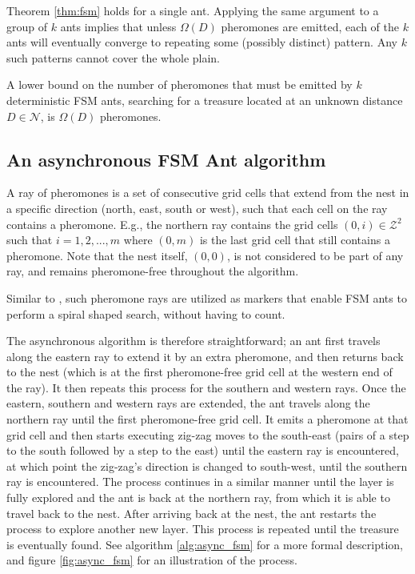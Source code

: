 \begin{observation}
Theorem \ref{thm:fsm} holds for a single ant. Applying the same argument to a group of $k$
ants implies that unless $\Omega(D)$ pheromones are emitted, each of the $k$ ants will
eventually converge to repeating some (possibly distinct) pattern. 
Any $k$ such patterns cannot cover the whole plain.
\end{observation}

\begin{corollary}
A lower bound on the number of pheromones that must be emitted by $k$ deterministic
FSM ants, searching for a treasure located at an unknown distance $D \in \mathcal{N}$, 
is $\Omega(D)$ pheromones.
\end{corollary}

\subsection{An asynchronous FSM Ant algorithm}

\begin{definition}[Ray]
A ray of pheromones is a set of consecutive grid cells that extend from the nest in a specific
direction (north, east, south or west), such that each cell on the ray contains a pheromone. 
E.g., the northern ray contains the grid cells $(0, i) \in \mathcal{Z}^2$ such that
$i = 1, 2, ..., m$ where $(0, m)$ is the last grid cell that still contains a pheromone.
Note that the nest itself, $(0,0)$, is not considered to be part of any ray, and remains 
pheromone-free throughout the algorithm.

Similar to \cite{Emek2013FSM}, such pheromone rays are utilized as markers that enable FSM ants to perform a spiral
 shaped search, without having to count. 
\end{definition}

The asynchronous algorithm is therefore straightforward; an ant first travels along the eastern ray to
extend it by an extra pheromone, and then returns back to the nest (which is at the first
pheromone-free grid cell at the western end of the ray). 
It then repeats this process for the southern and western rays.
 Once the eastern, southern and western rays are extended, the ant travels along
the northern ray until the first pheromone-free grid cell. It emits a pheromone at that grid
cell and then starts executing zig-zag moves to the south-east (pairs of a step to the south
followed by a step to the east) until the eastern ray is encountered, at which point the
zig-zag's direction is changed to south-west, until the southern ray is encountered.
The process continues in a similar manner until the layer is fully explored and the
 ant is back at the northern ray, from
which it is able to travel back to the nest. After arriving back at the nest, the ant restarts the
process to explore another new layer. This process is repeated until the treasure is
 eventually found. See algorithm \ref{alg:async_fsm} for a more formal description, and
figure \ref{fig:async_fsm} for an illustration of the process.

